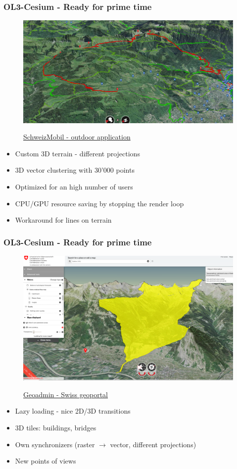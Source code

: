 \documentclass[handout]{beamer}
\begin{document}
  \begin{frame}
    \frametitle{OL3-Cesium - Ready for prime time}
    \begin{figure}
    \begin{center}
      \includegraphics[width=.6\linewidth]{./images/schweizmobil_vtt_3d3.png}
    \end{center}
    \href {https://map.schweizmobil.ch/?cesium&trackId=2149217&lang=fr&bgLayer=lb&resolution=10.86&X=561417&Y=141893&layers=Bus\%2CWanderland}{SchweizMobil - outdoor application}
    \end{figure}

    \begin{itemize}
      \item Custom 3D terrain - different projections
      \item 3D vector clustering with 30'000 points
      \item Optimized for an high number of users
      \item CPU/GPU resource saving by stopping the render loop
      \item Workaround for lines on terrain
     \end{itemize}
  \end{frame}

  \begin{frame}
    \frametitle{OL3-Cesium - Ready for prime time}
    \begin{figure}
    \begin{center}
      \includegraphics[width=.6\linewidth]{./images/geoadmin_water_catchment_areas.png}
    \end{center}
    \href {https://map.geo.admin.ch}{Geoadmin - Swiss geoportal}
    \end{figure}

    \begin{itemize}
      \item Lazy loading - nice 2D/3D transitions
      \item 3D tiles: buildings, bridges
      \item Own synchronizers (raster $\rightarrow$ vector, different projections)
      \item New points of views
    \end{itemize}
  \end{frame}
\end{document}
